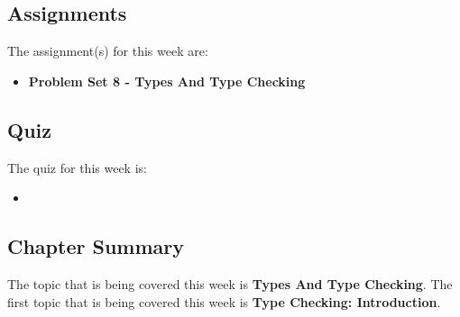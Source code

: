 \subsection{Assignments}

The assignment(s) for this week are:

\begin{itemize}
    \item \textbf{Problem Set 8 - Types And Type Checking}
\end{itemize}

\subsection{Quiz}

The quiz for this week is:

\begin{itemize}
    \item {}
\end{itemize}

\subsection{Chapter Summary}

The topic that is being covered this week is \textbf{Types And Type Checking}. The first topic that is being covered this week is \textbf{Type Checking: Introduction}.

